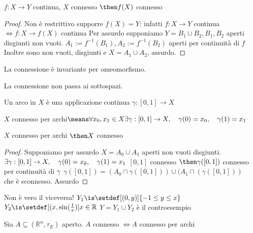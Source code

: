 \begin{teo}
 $f:X \rightarrow Y$ continua, $X$ connesso $\then f(X)$ connesso 
\end{teo}
\begin{proof}
  Non è restrittivo supporre $f(X)=Y$: infatti $f:X \rightarrow Y$ continua $\Leftrightarrow f:X\rightarrow f(X)$ continua
 Per assurdo supponiamo $Y = B_1 \cup B_2, B_1,B_2$ aperti disgiunti non vuoti.
 $A_1:=f^{-1}(B_1), A_2:=f^{-1}(B_2)$ aperti per continuità di $f$
 Inoltre sono non vuoti, disgiunti e $X=A_1\cup A_2$, assurdo.
\end{proof}
\begin{cor}
 La connessione è invariante per omeomorfismo. 
\end{cor}
\begin{oss}
 La connessione non passa ai sottospazi.
\end{oss}
\begin{defn}[Arco]
 Un arco in $X$ è una applicazione continua $\gamma:[0,1]\rightarrow X$
\end{defn}
\begin{defn}
 $X$ connesso per archi$\means \forall x_0, x_1 \in X \exists \gamma :[0,1]\rightarrow X,\quad \gamma(0)=x_0,\quad \gamma(1)=x_1$
\end{defn}
\begin{prop}
 $X$ connesso per archi $\then X$ connesso
\end{prop}
\begin{proof}
 Supponiamo per assurdo $X=A_0\cup A_1$ aperti non vuoti disgiunti.
 $\exists \gamma :[0,1]\rightarrow X,\quad \gamma(0)=x_0,\quad \gamma(1)=x_1\\$
 $[0,1]$ connesso $\then \gamma([0,1])$ connesso per continuità di $\gamma\\$
 $\gamma([0,1])=(A_0\cap \gamma([0,1])) \cup (A_1\cap(\gamma([0,1]))$ che è sconnesso. Assurdo
\end{proof}
\begin{es}
 Non è vero il viceversa!
 $Y_1\is\setdef[(0,y)]{-1\le y \le x}\\$
 $Y_2\is\setdef[(x,\sin (\frac{1}{x})]{x\in \mathbb R}\\$
 $Y=Y_1\cup Y_2$ è il controesempio 
\end{es}
\begin{prop}
 Sia $A\subseteq (\mathbb R^n, \tau _E)$ aperto.
 $A$ connesso $\Leftrightarrow A$ connesso per archi
\end{prop}
